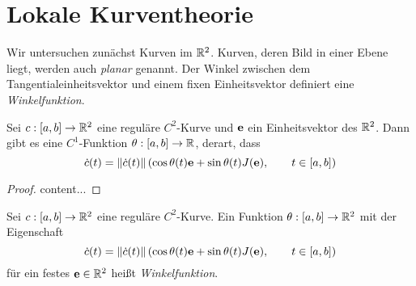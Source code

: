 \documentclass[
pdftex,
oneside,
headsepline,
11pt, 
]{scrreprt}
\begin{document}
\chapter{Lokale Kurventheorie}
Wir untersuchen zunächst Kurven im $\mathbb{R}^2$. Kurven, deren Bild in einer Ebene liegt, werden auch \textit{planar} genannt. Der Winkel zwischen dem Tangentialeinheitsvektor und einem fixen Einheitsvektor definiert eine \textit{Winkelfunktion}.
\begin{lem}
	Sei $c:[a,b]\to \mathbb{R}^2$ eine reguläre $C^2$-Kurve und $\textnormal{\textbf{e}}$ ein Einheitsvektor des $\mathbb{R}^2$. Dann gibt es eine $C^1$-Funktion $\theta:[a,b]\to \mathbb{R}$, derart, dass \[  \dot{c}(t)=\left\lVert\dot{c}(t)\right\rVert\left(  \cos \theta(t)\textnormal{\textbf{e}}+\sin\theta(t)J(\textnormal{\textbf{e}}), \qquad t\in [a,b]  \right) \]
	
\end{lem}
\begin{proof}
	content...
\end{proof}
\begin{de}[Winkelfunktion]
	Sei $c:[a,b]\to \mathbb{R}^2$ eine reguläre $C^2$-Kurve. Ein Funktion $\theta:[a,b]\to\mathbb{R}^2$ mit der Eigenschaft \[  \dot{c}(t)=\left\lVert\dot{c}(t)\right\rVert\left(  \cos \theta(t)\textnormal{\textbf{e}}+\sin\theta(t)J(\textnormal{\textbf{e}}), \qquad t\in [a,b]  \right) \]
	für ein festes $\textnormal{\textbf{e}}\in\mathbb{R}^2$ heißt \textit{Winkelfunktion}.
\end{de}
\end{document}
